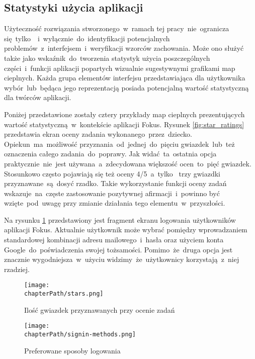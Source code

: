 \subsection{Statystyki użycia aplikacji}
Użyteczność rozwiązania stworzonego~w~ramach tej pracy~nie~ogranicza się~tylko~~i~wyłącznie~do~identyfikacji potencjalnych problemów~z~interfejsem~i~weryfikacji wzorców zachowania. Może ono służyć także jako wskaźnik~do~tworzenia statystyk użycia poszczególnych części~i~funkcji aplikacji popartych wizualnie sugestywnymi grafikami map cieplnych. Każda grupa elementów interfejsu przedstawiająca dla użytkownika wybór~lub~będąca jego reprezentacją posiada potencjalną wartość statystyczną dla twórców aplikacji.

Poniżej przedstawione zostały cztery przykłady map cieplnych prezentujących wartość statystyczną~w~kontekście aplikacji Fokus. Rysunek \ref{fig:star_ratings} przedstawia ekran oceny zadania wykonanego~przez~dziecko. Opiekun~ma~możliwość przyznania~od~jednej~do~pięciu gwiazdek~lub~też oznaczenia całego zadania~do~poprawy. Jak widać~ta~ostatnia opcja praktycznie~nie~jest używana~a~zdecydowana większość ocen~to~pięć gwiazdek. Stosunkowo często pojawiają się też oceny 4/5~a~tylko~ trzy gwiazdki przyznawane~są~dosyć rzadko. Takie wykorzystanie funkcji oceny zadań wskazuje~na~częste zastosowanie pozytywnej afirmacji~i~powinno być wzięte~pod~uwagę przy zmianie działania tego elementu~w~przyszłości.

Na rysunku \ref{fig:signin_methods} przedstawiony jest fragment ekranu logowania użytkowników aplikacji Fokus. Aktualnie użytkownik może wybrać pomiędzy wprowadzaniem standardowej kombinacji adresu mailowego~i~hasła oraz użyciem konta Google~do~poświadczenia swojej tożsamości. Pomimo~że~druga opcja jest znacznie wygodniejsza~w~użyciu widzimy~że~użytkownicy korzystają~z~niej rzadziej.

\bigskip
\begin{figure}[H]
\centering
\begin{minipage}{.45\textwidth}
	\centering
	\texttt{[image: \\chapterPath/stars.png]}
	\bigskip
	\caption{Ilość gwiazdek przyznawanych przy ocenie zadań}
	\label{fig:star_ratings}
\end{minipage}
\begin{minipage}{.45\textwidth}
	\centering
	\texttt{[image: \\chapterPath/signin-methods.png]}
	\bigskip
	\caption{Preferowane sposoby logowania}
	\label{fig:signin_methods}
\end{minipage}
\end{figure}

